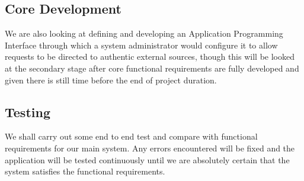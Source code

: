 \documentclass[12pt]{article}
\begin{document}
\vspace{\baselineskip}
\vspace{\baselineskip}
\vspace{\baselineskip}
\vspace{\baselineskip}
\vspace{\baselineskip}
\vspace{\baselineskip}
\vspace{\baselineskip}
\vspace{\baselineskip}
\vspace{\baselineskip}
\vspace{\baselineskip}
\vspace{\baselineskip}
\vspace{\baselineskip}
\vspace{\baselineskip}
\vspace{\baselineskip}
\vspace{\baselineskip}
\vspace{\baselineskip}
\vspace{\baselineskip}
\vspace{\baselineskip}
\vspace{\baselineskip}

\vspace{\baselineskip}
\setlength{\parskip}{8.04pt}

\vspace{\baselineskip}

\vspace{\baselineskip}
\subsection{Core Development }

\vspace{\baselineskip}
We are also looking at defining and developing an Application Programming Interface \cite{Wik15} through which a system administrator would configure it to allow requests to be directed to authentic external sources, though this will be looked at the secondary stage after core functional requirements are fully developed and given there is still time before the end of project duration.\par

\subsection*{Testing}
We shall carry out some end to end test and compare with functional requirements for our main system. Any errors encountered will be fixed and the application will be tested continuously until we are absolutely certain that the system satisfies the functional requirements.\par
\end{document}
